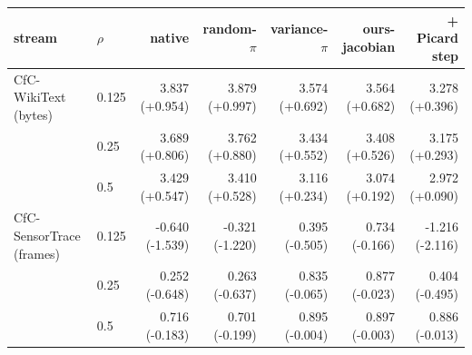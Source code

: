 {\scriptsize\setlength{\tabcolsep}{3pt}
\begin{tabular}{llrrrrr}
\toprule
stream & $\rho$ & native & random-$\pi$ & variance-$\pi$ & ours-jacobian & + Picard step \\
\midrule
CfC-WikiText (bytes) & 0.125 & 3.837 (+0.954) & 3.879 (+0.997) & 3.574 (+0.692) & 3.564 (+0.682) & 3.278 (+0.396) \\
 & 0.25 & 3.689 (+0.806) & 3.762 (+0.880) & 3.434 (+0.552) & 3.408 (+0.526) & 3.175 (+0.293) \\
 & 0.5 & 3.429 (+0.547) & 3.410 (+0.528) & 3.116 (+0.234) & 3.074 (+0.192) & 2.972 (+0.090) \\
\midrule
CfC-SensorTrace (frames) & 0.125 & -0.640 (-1.539) & -0.321 (-1.220) & 0.395 (-0.505) & 0.734 (-0.166) & -1.216 (-2.116) \\
 & 0.25 & 0.252 (-0.648) & 0.263 (-0.637) & 0.835 (-0.065) & 0.877 (-0.023) & 0.404 (-0.495) \\
 & 0.5 & 0.716 (-0.183) & 0.701 (-0.199) & 0.895 (-0.004) & 0.897 (-0.003) & 0.886 (-0.013) \\
\bottomrule
\end{tabular}}
